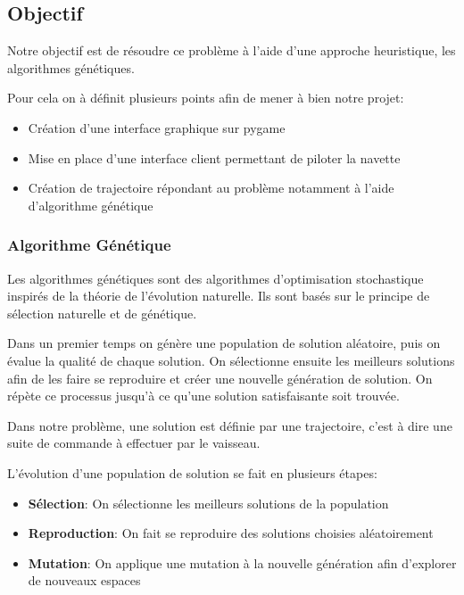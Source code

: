\documentclass[french,a4paper,10pt,twocolumn]{article}
\begin{document}
\subsection{Objectif}

Notre objectif est de résoudre ce problème à l'aide d'une approche heuristique, les algorithmes génétiques. 

Pour cela on à définit plusieurs points afin de mener à bien notre projet: 
\begin{itemize}
    \item Création d'une interface graphique sur pygame
    \item Mise en place d'une interface client permettant de piloter la navette
    \item Création de trajectoire répondant au problème notamment à l'aide d'algorithme génétique    
\end{itemize}

\subsubsection{Algorithme Génétique}

Les algorithmes génétiques sont des algorithmes d'optimisation stochastique inspirés de la théorie de l'évolution naturelle.
Ils sont basés sur le principe de sélection naturelle et de génétique.

Dans un premier temps on génère une population de solution aléatoire, puis on évalue la qualité de chaque solution.
On sélectionne ensuite les meilleurs solutions afin de les faire se reproduire et créer une nouvelle génération de solution.
On répète ce processus jusqu'à ce qu'une solution satisfaisante soit trouvée.

Dans notre problème, une solution est définie par une trajectoire, c'est à dire une suite de commande à effectuer par le vaisseau.



L'évolution d'une population de solution se fait en plusieurs étapes:
\begin{itemize}
    \item \textbf{Sélection}: On sélectionne les meilleurs solutions de la population
    \item \textbf{Reproduction}: On fait se reproduire des solutions choisies aléatoirement
    \item \textbf{Mutation}: On applique une mutation à la nouvelle génération afin d'explorer de nouveaux espaces
\end{itemize}
\end{document}
